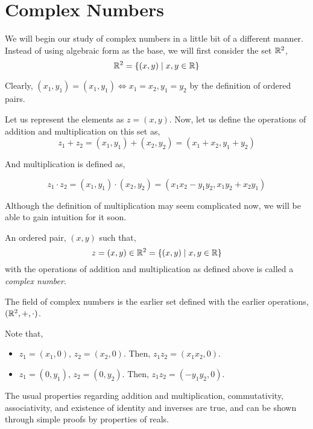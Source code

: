 \chapter{Complex Numbers}

We will begin our study of complex numbers in a little bit of a 
different manner. Instead of using algebraic form as the base, we will
first consider the set \(\mathbb R^2\),
\[\mathbb R^2 = \left\{(x,y) \mid x, y \in \mathbb R\right\}\]

Clearly, \((x_1, y_1) = (x_1, y_1) \iff x_1 = x_2, y_1 = y_2\) by the definition of 
ordered pairs.

Let us represent the elements as \(z = (x, y)\). Now, let us define the operations of addition and multiplication on this set as, 
\[
    z_1 + z_2 = (x_1, y_1) + (x_2, y_2) = (x_1 + x_2, y_1 + y_2)
\]

And multiplication is defined as,

\[
    z_1 \cdot z_2 = (x_1, y_1) \cdot (x_2, y_2) = (x_1x_2 - y_1y_2, x_1y_2 + x_2y_1)
\]

Although the definition of multiplication may seem complicated now, we will be able
to gain intuition for it soon.


\begin{definition}
    An ordered pair, \((x, y)\) such that,
    \[
        z = (x, y) \in \mathbb R^2 = \left\{(x, y) \mid x, y \in \mathbb R \right\}
    \]
    with the operations of addition and multiplication as defined
    above is called a \emph{complex number}.
\end{definition}

The field of complex numbers is the earlier set defined with the earlier operations,
\((\mathbb R^2, +, \cdot)\). 

\begin{remark}
    Note that,
    \begin{itemize}
        \item \(z_{1} = (x_{1}, 0)\), \(z_2 = (x_2, 0)\). Then, \(z_1z_2 = (x_1x_2, 0)\).
        \item \(z_1 = (0, y_1)\), \(z_2 = (0, y_2)\). Then, \(z_1z_2 = (-y_1y_2, 0)\).
    \end{itemize}
\end{remark}

The usual properties regarding addition and multiplication, commutativity, associativity, and existence of identity
and inverses are true, and can be shown through simple proofs by properties of reals.

